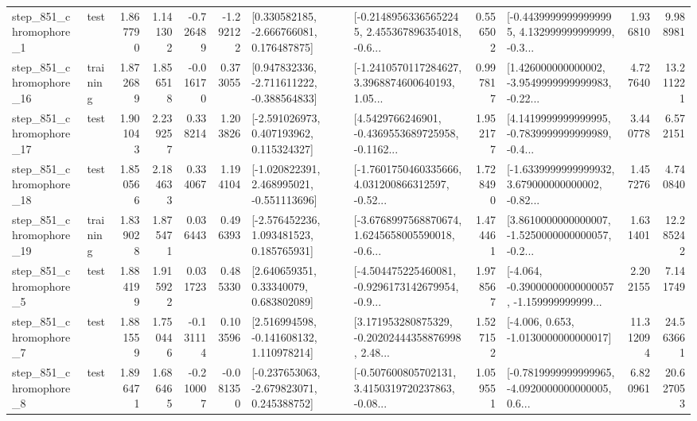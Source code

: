 \begin{tabular}{llrrrrllrlrr}
   step\_851\_chromophore\_1 &      test &      1.867790 &    1.141302 &     -0.726489 & -1.292122 &    [0.330582185, -2.666766081, 0.176487875] &  [-0.21489563365652245, 2.455367896354018, -0.6... &       0.556502 &  [-0.44399999999999995, 4.132999999999999, -0.3... &            1.936810 &          9.988981 \\
  step\_851\_chromophore\_16 &  training &      1.872689 &    1.856518 &     -0.016170 &  0.373055 &   [0.947832336, -2.711611222, -0.388564833] &  [-1.2410570117284627, 3.3968874600640193, 1.05... &       0.997817 &  [1.426000000000002, -3.9549999999999983, -0.22... &            4.727640 &         13.211221 \\
  step\_851\_chromophore\_17 &      test &      1.901043 &    2.239257 &      0.338214 &  1.203826 &    [-2.591026973, 0.407193962, 0.115324327] &  [4.5429766246901, -0.4369553689725958, -0.1162... &       1.952177 &  [4.1419999999999995, -0.7839999999999989, -0.4... &            3.440778 &          6.572151 \\
  step\_851\_chromophore\_18 &      test &      1.850566 &    2.184633 &      0.334067 &  1.194104 &   [-1.020822391, 2.468995021, -0.551113696] &  [-1.7601750460335666, 4.031200866312597, -0.52... &       1.728490 &  [-1.6339999999999932, 3.679000000000002, -0.82... &            1.457276 &          4.740840 \\
  step\_851\_chromophore\_19 &  training &      1.839028 &    1.875471 &      0.036443 &  0.496393 &    [-2.576452236, 1.093481523, 0.185765931] &  [-3.6768997568870674, 1.6245658005590018, -0.6... &       1.474461 &  [3.8610000000000007, -1.5250000000000057, -0.2... &            1.631401 &         12.285242 \\
   step\_851\_chromophore\_5 &      test &      1.884199 &    1.915922 &      0.031723 &  0.485330 &      [2.640659351, 0.33340079, 0.683802089] &  [-4.504475225460081, -0.9296173142679954, -0.9... &       1.978567 &  [-4.064, -0.39000000000000057, -1.159999999999... &            2.202155 &          7.141749 \\
   step\_851\_chromophore\_7 &      test &      1.881559 &    1.750446 &     -0.131114 &  0.103596 &    [2.516994598, -0.141608132, 1.110978214] &  [3.171953280875329, -0.20202444358876998, 2.48... &       1.527152 &               [-4.006, 0.653, -1.0130000000000017] &           11.312094 &         24.563661 \\
   step\_851\_chromophore\_8 &      test &      1.896471 &    1.686465 &     -0.210007 & -0.081350 &   [-0.237653063, -2.679823071, 0.245388752] &  [-0.507600805702131, 3.4150319720237863, -0.08... &       1.059551 &  [-0.7819999999999965, -4.0920000000000005, 0.6... &            6.820961 &         20.627053 \\

\end{tabular}
